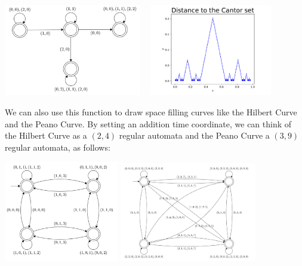 \documentclass[10pt,usenames,dvipsnames]{article}
\begin{document}
\begin{center}
    \includegraphics[width=6cm]{FA20/images/fractals/cantord-automata.png}
    \includegraphics[width=6cm,height=4cm]{FA20/images/fractals/cantord.pdf}
\end{center}

We can also use this function to draw space filling curves like the Hilbert Curve and the Peano Curve. By setting an addition time coordinate, we can think of the Hilbert Curve as a $(2,4)$ regular automata and the Peano Curve a $(3,9)$ regular automata, as follows:

\begin{center}
    \includegraphics[width=5cm]{FA20/images/fractals/hilbert-automata.png}
    \includegraphics[width=6cm]{FA20/images/fractals/peano-automata.png}
\end{center}
\end{document}
